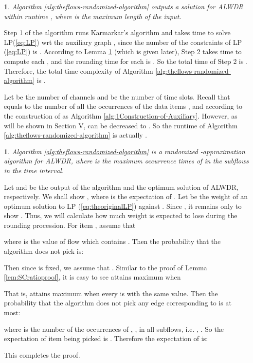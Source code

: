 \documentclass[11pt,english,onecolumn,draftcls]{IEEEtran}
\theoremstyle{plain}
\theoremstyle{plain}
\theoremstyle{plain}
\newtheorem{lem}[thm]{\protect\lemmaname}
\theoremstyle{plain}
\providecommand{\lemmaname}{Lemma}
\begin{document}
\begin{lem}
\label{lem:flowOAtime}Algorithm \ref{alg:theflows-randomized-algorithm}
outputs a solution for ALWDR within runtime ,
where  is the maximum length of the input.\end{lem}
\begin{IEEEproof}
Step 1 of the algorithm runs Karmarkar's algorithm and takes 
time to solve LP(\ref{eq:LP}) wrt the auxiliary graph , since
the number of the constraints of LP (\ref{eq:LP}) is .
According to Lemma \ref{lem:ratioOAflowLPadmits} (which is given
later), Step 2 takes  time to compute
each , and the rounding time for each 
is . So the
total time of Step 2 is . Therefore,
the total time complexity of Algorithm \ref{alg:theflows-randomized-algorithm}
is .
\end{IEEEproof}
Let  be the number of channels and  be the number of time
slots. Recall that  equals to the number of all
the occurrences of the data items , and 
according to the construction of  as Algorithm \ref{alg:1Construction-of-Auxiliary}.
However, as will be shown in Section V,  can be
decreased to . So the runtime
of Algorithm \ref{alg:theflows-randomized-algorithm} is actually
.
\begin{lem}
\label{lem:ratioOAflowLPadmits}Algorithm \ref{alg:theflows-randomized-algorithm}
is a randomized -approximation algorithm
for ALWDR, where  is the maximum occurrence
times of  in the subflows in the time interval. \end{lem}
\begin{IEEEproof}
Let  and  be the output of the algorithm and the optimum
solution of ALWDR, respectively. We shall show ,
where  is the expectation of . Let 
be the weight of an optimum solution to LP (\ref{eq:theoriginalLP})
against . Since , it remains only to show
. Thus, we will
calculate how much weight is expected to lose during the rounding
procession. For item , assume that

where  is the value of flow  which contains .
Then the probability that the algorithm does not pick  is:




Then since 
is fixed, we assume that .
Similar to the proof of Lemma \ref{lem:SCratioproof}, it is easy
to see  attains maximum when




That is,  attains maximum when every 
is with the same value. Then the probability that the algorithm does
not pick any edge corresponding to  is at most:




where  is the number of the occurrences of , ,
in all subflows, i.e. , . So the expectation
of item  being picked is .
Therefore the expectation of  is:

This completes the proof.
\end{IEEEproof}
\end{document}
